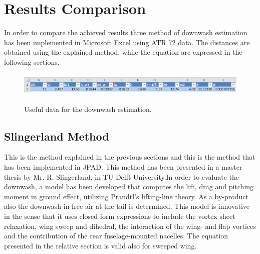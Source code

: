 \section{Results Comparison}

In order to compare the achieved results three method of downwash estimation has been implemented in Microsoft Excel using ATR 72 data. The distances are obtained using the explained method, while the equation are expressed in the following sections.



\begin{figure}[H]
	\centering
{\includegraphics[height=1.1cm]{Immagini/datadownwash.png}} 
	\caption{Useful data for the downwash estimation.}
	\label{usefuldata}
\end{figure}

\subsection {Slingerland Method }

This is the method explained in the previous sections and this is the method that has been implemented in JPAD. This method has been presented in a master thesis by Mr. R. Slingerland, in TU Delft University.In order to evaluate the downwash, a model has been developed that computes the lift, drag and pitching moment in ground effect, utilizing Prandtl's lifting-line theory. As a by-product also the downwash in free air at the tail is determined. This model is innovative in the sense that it uses closed form expressions to include the vortex sheet relaxation, wing sweep and dihedral, the interaction of the wing- and flap vortices and the contribution of the rear fuselage-mounted nacelles. The equation presented in the relative section is valid also for sweeped wing.

